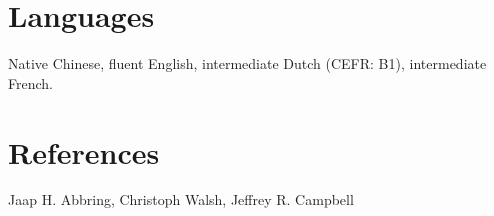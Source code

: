 \documentclass[margin,line]{res}
\newenvironment{list1}{
  \begin{list}{\ding{113}}{%
      \setlength{\itemsep}{0in}
      \setlength{\parsep}{0in} \setlength{\parskip}{0in}
      \setlength{\topsep}{0in} \setlength{\partopsep}{0in} 
      \setlength{\leftmargin}{0.17in}}}{\end{list}}
\begin{document}
\begin{resume}

\section{\sc Languages} 
Native Chinese, fluent English, intermediate Dutch (CEFR: B1), intermediate French.

\section{\sc References}
Jaap H. Abbring, Christoph Walsh, Jeffrey R. Campbell

\end{resume}
\end{document}
